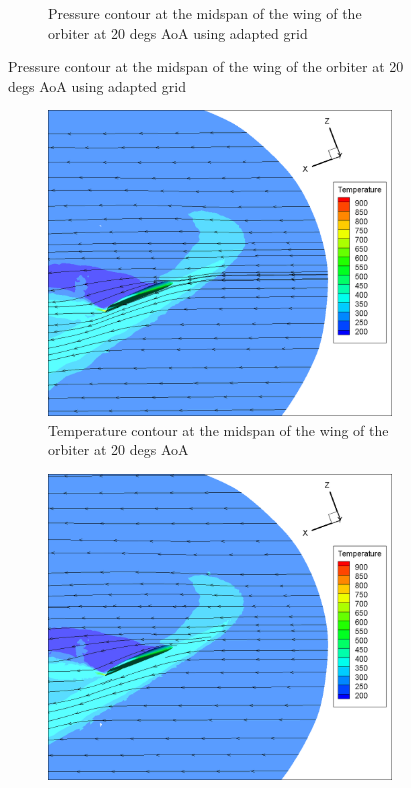 \begin{figure}[H]
\begin{subfigure}[b]{0.65\textwidth}
		 \caption{Pressure contour at the midspan of the wing of the orbiter at 20 degs AoA using adapted grid}
		 \label{fig: 20_adapt_wing_pressure_contour}
    \end{subfigure}
\end{figure}

\begin{figure}[H]

	\centering
    \begin{subfigure}[b]{0.65\textwidth}
         \centering
		 \includegraphics[width=\textwidth]{report_images/20_wing_temp_contour.png}
		 \caption{Temperature contour at the midspan of the wing of the orbiter at 20 degs AoA}
		 \label{fig: 20_wing_temp_contour}
    \end{subfigure} 
    \begin{subfigure}[b]{0.65\textwidth}
         \centering
		 \includegraphics[width=\textwidth]{report_images/20_adapted_wing_temp_contour.png}

\end{subfigure}
\end{figure}
